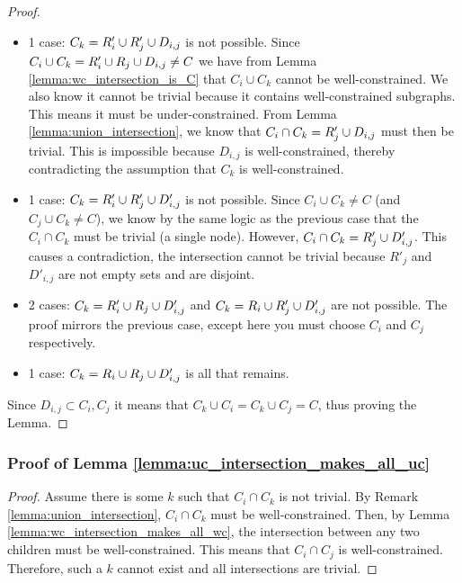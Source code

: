 \begin{proof}
\begin{itemize}
    \item 1 case: $C_k=R'_i\cup R'_j\cup D_{i,j}$ is not possible. Since $C_i\cup C_k = R'_i\cup R_j\cup D_{i,j}\neq C$ we have from Lemma \ref{lemma:wc_intersection_is_C} that $C_i\cup C_k$ cannot be well-constrained. We also know it cannot be trivial because it contains well-constrained subgraphs. This means it must be under-constrained. From Lemma \ref{lemma:union_intersection}, we know that $C_i\cap C_k=R'_j\cup D_{i,j}$ must then be trivial. This is impossible because $D_{i,j}$ is well-constrained, thereby contradicting the assumption that $C_k$ is well-constrained.

    \item 1 case:  $C_k=R'_i\cup R'_j\cup D'_{i,j}$ is not possible. Since $C_i\cup C_k\neq C$ (and $C_j\cup C_k\neq C$), we know by the same logic as the previous case that the $C_i\cap C_k$ must be trivial (a single node). However, $C_i\cap C_k=R'_j\cup D'_{i,j}$. This causes a contradiction, the intersection cannot be trivial because $R'_j$ and $D'_{i,j}$ are not empty sets and are disjoint.

    \item 2 cases:  $C_k=R'_i\cup R_j\cup D'_{i,j}$ and $C_k=R_i\cup R'_j\cup D'_{i,j}$ are not possible. The proof mirrors the previous case, except here you must choose $C_i$ and $C_j$ respectively.

    \item 1 case: $C_k=R_i\cup R_j\cup D'_{i,j}$ is all that remains.
\end{itemize}

Since $D_{i,j}\subset C_i, C_j$ it means that $C_k\cup C_i = C_k \cup C_j = C$, thus proving the Lemma.
%
\end{proof}


\subsubsection{Proof of Lemma \ref{lemma:uc_intersection_makes_all_uc}}

\begin{proof}
Assume there is some $k$ such that $C_i\cap C_k$ is not trivial. By Remark \ref{lemma:union_intersection}, $C_i\cap C_k$ must be well-constrained. Then, by Lemma \ref{lemma:wc_intersection_makes_all_wc}, the intersection between any two children must be well-constrained. This means that $C_i\cap C_j$ is well-constrained. Therefore, such a $k$ cannot exist and all intersections are trivial.
\end{proof}




